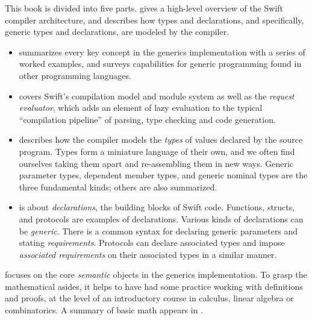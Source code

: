 \documentclass[../generics]{subfiles}
\begin{document}
This book is divided into five parts.  gives a high-level overview of the Swift compiler architecture, and describes how types and declarations, and specifically, generic types and declarations, are modeled by the compiler.
\begin{itemize}
\item {} summarizes every key concept in the generics implementation with a series of worked examples, and surveys capabilities for generic programming found in other programming languages.
\item {} covers Swift's compilation model and module system as well as the \emph{request evaluator}, which adds an element of lazy evaluation to the typical ``compilation pipeline'' of parsing, type checking and code generation.
\item {} describes how the compiler models the \emph{types} of values declared by the source program. Types form a miniature language of their own, and we often find ourselves taking them apart and re-assembling them in new ways. Generic parameter types, dependent member types, and generic nominal types are the three fundamental kinds; others are also summarized.
\item {} is about \emph{declarations}, the building blocks of Swift code. Functions, structs, and protocols are examples of declarations. Various kinds of declarations can be \emph{generic}. There is a common syntax for declaring generic parameters and stating \emph{requirements}. Protocols can declare associated types and impose \emph{associated requirements} on their associated types in a similar manner.
\end{itemize}
 focuses on the core \emph{semantic} objects in the generics implementation. To grasp the mathematical asides, it helps to have had some practice working with definitions and proofs, at the level of an introductory course in calculus, linear algebra or combinatorics. A summary of basic math appears in .
\end{document}
